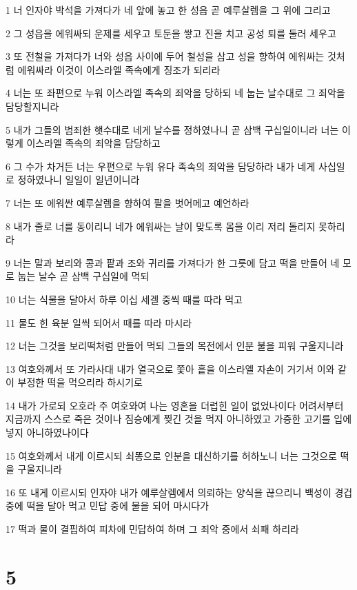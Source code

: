 \par 1 너 인자야 박석을 가져다가 네 앞에 놓고 한 성읍 곧 예루살렘을 그 위에 그리고
\par 2 그 성읍을 에워싸되 운제를 세우고 토둔을 쌓고 진을 치고 공성 퇴를 둘러 세우고
\par 3 또 전철을 가져다가 너와 성읍 사이에 두어 철성을 삼고 성을 향하여 에워싸는 것처럼 에워싸라 이것이 이스라엘 족속에게 징조가 되리라
\par 4 너는 또 좌편으로 누워 이스라엘 족속의 죄악을 당하되 네 눕는 날수대로 그 죄악을 담당할지니라
\par 5 내가 그들의 범죄한 햇수대로 네게 날수를 정하였나니 곧 삼백 구십일이니라 너는 이렇게 이스라엘 족속의 죄악을 담당하고
\par 6 그 수가 차거든 너는 우편으로 누워 유다 족속의 죄악을 담당하라 내가 네게 사십일로 정하였나니 일일이 일년이니라
\par 7 너는 또 에워싼 예루살렘을 향하여 팔을 벗어메고 예언하라
\par 8 내가 줄로 너를 동이리니 네가 에워싸는 날이 맞도록 몸을 이리 저리 돌리지 못하리라
\par 9 너는 말과 보리와 콩과 팥과 조와 귀리를 가져다가 한 그릇에 담고 떡을 만들어 네 모로 눕는 날수 곧 삼백 구십일에 먹되
\par 10 너는 식물을 달아서 하루 이십 세겔 중씩 때를 따라 먹고
\par 11 물도 힌 육분 일씩 되어서 때를 따라 마시라
\par 12 너는 그것을 보리떡처럼 만들어 먹되 그들의 목전에서 인분 불을 피워 구울지니라
\par 13 여호와께서 또 가라사대 내가 열국으로 쫓아 흩을 이스라엘 자손이 거기서 이와 같이 부정한 떡을 먹으리라 하시기로
\par 14 내가 가로되 오호라 주 여호와여 나는 영혼을 더럽힌 일이 없었나이다 어려서부터 지금까지 스스로 죽은 것이나 짐승에게 찢긴 것을 먹지 아니하였고 가증한 고기를 입에 넣지 아니하였나이다
\par 15 여호와께서 내게 이르시되 쇠똥으로 인분을 대신하기를 허하노니 너는 그것으로 떡을 구울지니라
\par 16 또 내게 이르시되 인자야 내가 예루살렘에서 의뢰하는 양식을 끊으리니 백성이 경겁 중에 떡을 달아 먹고 민답 중에 물을 되어 마시다가
\par 17 떡과 물이 결핍하여 피차에 민답하여 하며 그 죄악 중에서 쇠패 하리라

\chapter{5}

